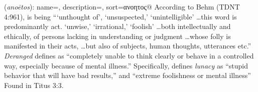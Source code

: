 \item[Lunacy,]

(\textit{anoētos}):
{
    name=,
    description={},
    sort=ανοητος@
}
According to Behm (TDNT 4:961), is being ```unthought of', `unsuspected,' `unintelligible' \ldots this word is predominantly act. `unwise,' `irrational,' `foolish' \ldots both intellectually and ethically, of persons lacking in understanding or judgment \ldots whose folly is manifested in their acts, \ldots but also of subjects, human thoughts, utterances etc.'' 
\emph{Deranged} defines as ``completely unable to think clearly or behave in a controlled way, especially because of mental illness.'' Specifically, defines \emph{lunacy} as ``stupid behavior that will have bad results,'' and ``extreme foolishness or mental illness''
Found in Titus 3:3.
